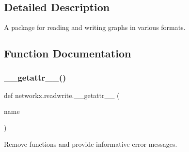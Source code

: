 \subsection{Detailed Description}
\begin{DoxyVerb}A package for reading and writing graphs in various formats.\end{DoxyVerb}
 

\subsection{Function Documentation}
\mbox{\label{namespacenetworkx_1_1readwrite_a4686bfe2cc0a399e43960c07d3488586}} 
\subsubsection{\texorpdfstring{\+\_\+\+\_\+getattr\+\_\+\+\_\+()}{\_\_getattr\_\_()}}
{\footnotesize\ttfamily def networkx.\+readwrite.\+\_\+\+\_\+getattr\+\_\+\+\_\+ (\begin{DoxyParamCaption}\item[{}]{name }\end{DoxyParamCaption})}

\begin{DoxyVerb}Remove functions and provide informative error messages.\end{DoxyVerb}
 